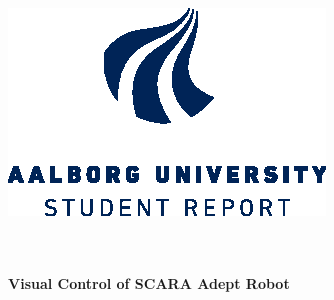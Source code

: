 \begin{titlepage}

\enlargethispage{10\baselineskip}



\center %
 

\begin{minipage}[t]{\textwidth}
\begin{flushright}
  
\includegraphics[scale=1]{./forside/84800_aau_uk_studentreport_blue_cmyk}
\end{flushright}

\end{minipage}\\[1cm]
\HRule \\[0.4cm]
{ \huge \bfseries Visual Control of SCARA Adept Robot}\\[0.2cm] %
\HRule \\[.4cm]


\end{titlepage}
